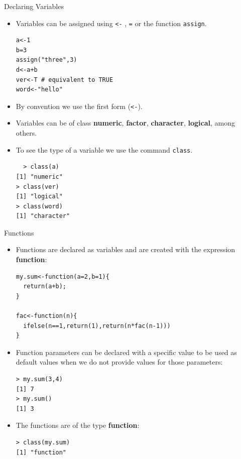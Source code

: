 \documentclass[handout]{beamer}
\begin{document}
\begin{frame}[fragile]{Declaring Variables}
\scriptsize{
\begin{itemize}
 \item Variables can be assigned using \verb+<-+ , \verb+=+ or the function \verb+assign+.
 
  \begin{verbatim}
a<-1
b=3
assign("three",3)
d<-a+b
ver<-T # equivalent to TRUE
word<-"hello"
\end{verbatim}
 
 \item By convention we use the first form (\verb+<-+).
 
\item Variables can be of class \textbf{numeric}, \textbf{factor}, \textbf{character}, \textbf{logical}, among others.
 
\item To see the type of a variable we use the command \verb+class+.
 \begin{verbatim}
  > class(a) 
[1] "numeric"
> class(ver)
[1] "logical"
> class(word)
[1] "character"
 \end{verbatim}

 
 
\end{itemize}

}


\end{frame}


\begin{frame}[fragile]{Functions}
\scriptsize{
\begin{itemize}
 \item Functions are declared as variables and are created with the expression \textbf{function}:

\begin{verbatim}
my.sum<-function(a=2,b=1){
  return(a+b);
}

fac<-function(n){
  ifelse(n==1,return(1),return(n*fac(n-1)))    
}

\end{verbatim}

\item Function parameters can be declared with a specific value to be used as default values when we do not provide values for those parameters:
\begin{verbatim}
> my.sum(3,4)
[1] 7
> my.sum()
[1] 3 
\end{verbatim}

\item The functions are of the type \textbf{function}:
\begin{verbatim}
> class(my.sum)
[1] "function" 
\end{verbatim}


\end{itemize}


 
} 
\end{frame}
\end{document}
